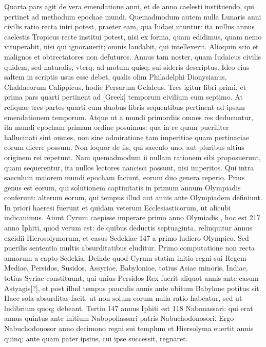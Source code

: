 Quarta pars agit de vera emendatione anni, et
de anno caelesti instituendo, qui pertinet ad methodum epochae
mundi.
Quemadmodum autem nulla Lunaris anni civilis ratio
recta iniri potest, praeter eam, qua Iudaei utuntur: ita nullus annus
caelestis Tropicus recte institui potest, nisi ex forma, quam edidimus,
quam nemo vituperabit, nisi qui ignorauerit; omnis laudabit,
qui intellexerit.
Alioquin scio et malignos et obtrectatores non defuturos. 
Annus tam noster, quam Iudaicus civilis quidem, sed naturalis,
vterq; ad motum quisq; sui sideris descriptus. 
Ideo eius saltem
in scriptis usus esse debet, qualis olim Philadelphi Dionysianus,
Chaldaeorum Calippicus, hodie Persarum Gelaleus. 
Tres igitur libri
primi, et prima pars quarti pertinent ad \textgreek{[Greek]} temporum civilium
cum septimo.
At reliquae tres partes quarti cum duobus libris
sequentibus pertinent ad ipsam emendationem temporum.
Atque
ut a mundi primordiis omnes res deducuntur, ita mundi epocham
primam ordine posuimus: qua in re quam pueriliter hallucinati sint
omnes, non sine admiratione tam imperitiae quam pertinaciae eorum
dicere possum.
Non loquor de iis, qui saeculo uno, aut pluribus altius
originem rei repetunt.
Nam quemadmodum ii nullam rationem
sibi proposuerunt, quam sequerentur, ita nullos lectores nancisci
possunt, nisi imperitos. 
Qui intra saeculum maiorem mundi
epocham faciunt, eorum duo genera reperio.
Prius genus est eorum,
qui solutionem captiuitatis in primum annum Olympiadis  conferunt:
alterum eorum, qui tempus illud  aut  annis ante
 Olympiadem definiunt.
In priori haeresi fuerunt et
quidam veterum Ecclesiasticorum, ut alicubi indicauimus. 
Aiunt
Cyrum caepisse imperare primo anno Olymiadis , hoc est 217
anno Iphiti, quod verum est: de quibus deductis septuaginta, relinquitur
annus excidii Hierosolymorum, et casus Sedekiae 147 a primo ludicro
Olympico.
Sed puerilis sententia multis absurditatibus eluditur.
Primo computatione non recta annorum  a capto Sedekia.
Deinde quod Cyrum statim initio regni sui Regem Mediae, Persidos,
Susidos, Assyriae, Babyloniae, totius Asiae minoris, Indiae, totius
Syriae constituunt, qui unius Persidos Rex fuerit aliquot annis ante
casum Astyagis[?], et post illud tempus pauculis annis ante obitum
Babylone potitus sit.
Haec sola absurditas facit, ut non solum eorum
nulla ratio habeatur, sed ut ludibrium quoq; debeant.
Tertio 147 annus
Iphiti est 118 Nabonassari: qui erat annus quintus ante initium Nabopollassari
patris Nabuchodonosori.
Ergo Nabuchodonosor anno
decimono regni sui templum et Hiersolyma euertit annis quinq;
ante quam pater ipsius, cui ipse successit, regnaret.

